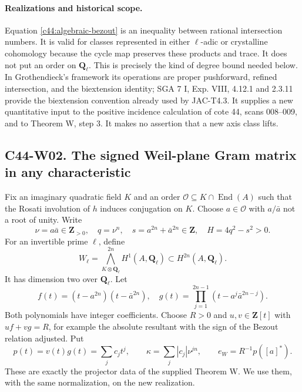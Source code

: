 \paragraph{Realizations and historical scope.}
Equation \eqref{c44:algebraic-bezout} is an inequality between rational
intersection numbers.  It is valid for classes represented in either
$\ell$-adic or crystalline cohomology because the cycle map preserves
these products and trace.  It does not put an order on $\mathbf Q_\ell$.
This is precisely the kind of degree bound needed below.  In
Grothendieck's framework its operations are proper pushforward, refined
intersection, and the biextension identity; SGA 7 I, Exp. VIII,
4.12.1 and 2.3.11 provide the biextension convention already used by
JAC-T4.3.  It supplies a new quantitative input to the positive
incidence calculation of cote 44, scans 008--009, and to Theorem W,
step 3.  It makes no assertion that a new axis class lifts.

\subsection*{C44-W02. The signed Weil-plane Gram matrix in any characteristic}

Fix an imaginary quadratic field $K$ and an order
$\mathcal O\subseteq K\cap\operatorname{End}(A)$ such that the Rosati
involution of $h$ induces conjugation on $K$.  Choose
$a\in\mathcal O$ with $a/\bar a$ not a root of unity.  Write
\[
 \nu=a\bar a\in\mathbf Z_{>0},\quad q=\nu^n,\quad
 s=a^{2n}+\bar a^{2n}\in\mathbf Z,\quad H=4q^2-s^2>0.
\]
For an invertible prime $\ell$, define
\[
 W_\ell=\bigwedge_{K\otimes\mathbf Q_\ell}^{2n}H^1(A,\mathbf Q_\ell)
 \subset H^{2n}(A,\mathbf Q_\ell).
\]
It has dimension two over $\mathbf Q_\ell$.  Let
\[
 f(t)=(t-a^{2n})(t-\bar a^{2n}),\quad
 g(t)=\prod_{j=1}^{2n-1}(t-a^j\bar a^{2n-j}).
\]
Both polynomials have integer coefficients.  Choose $R>0$ and
$u,v\in\mathbf Z[t]$ with $uf+vg=R$, for example the absolute
resultant with the sign of the Bezout relation adjusted.  Put
\[
 p(t)=v(t)g(t)=\sum_jc_jt^j,\qquad
 \kappa=\sum_j|c_j|\nu^{jn},\qquad e_W=R^{-1}p([a]^*).
\]
These are exactly the projector data of the supplied Theorem W.
We use them, with the same normalization, on the new realization.

